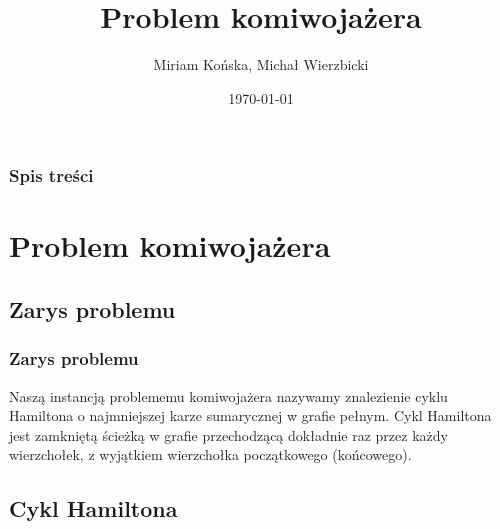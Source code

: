 \documentclass{beamer}
\title[TSP ACU]{Problem komiwojażera} %
\author{Miriam Końska, Michał Wierzbicki} %
\institute[IIUWr] %
{
University of Wrocław \\ %
\medskip
}
\date{\today} %
\begin{document}
\begin{frame}
\titlepage %
\end{frame}

\begin{frame}
\frametitle{Spis treści} %
\tableofcontents %
\end{frame}


\section{Problem komiwojażera} %

\subsection{Zarys problemu} %


\begin{frame}
\frametitle{Zarys problemu}
Naszą instancją problememu komiwojażera nazywamy znalezienie cyklu Hamiltona o najmniejszej karze sumarycznej w grafie pełnym.
Cykl Hamiltona jest zamkniętą ścieżką w grafie przechodzącą dokładnie raz przez każdy wierzchołek, z wyjątkiem wierzchołka początkowego (końcowego).

\end{frame}


\subsection{Cykl Hamiltona}
\end{document}
